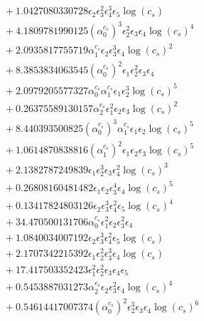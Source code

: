 \documentclass[10pt]{article}
\begin{document}
\begin{align*}
&{}  + 1.0427080330728 \epsilon_{2} \epsilon_{3}^{2} \epsilon_{4}^{3} \epsilon_{5} \log{\left(c_{s} \right)} \\
&{}  + 4.1809781990125 \left(\alpha_{0}^{c_s}\right)^{3} \epsilon_{2}^{2} \epsilon_{3} \epsilon_{4} \log{\left(c_{s} \right)}^{4} \\
&{}  + 2.0935817755719 \alpha_{1}^{c_s} \epsilon_{2} \epsilon_{3}^{3} \epsilon_{4} \log{\left(c_{s} \right)}^{2} \\
&{}  + 8.3853834063545 \left(\alpha_{0}^{c_s}\right)^{2} \epsilon_{1} \epsilon_{2}^{2} \epsilon_{3} \epsilon_{4} \\
&{}  + 2.0979205577327 \alpha_{0}^{c_s} \alpha_{1}^{c_s} \epsilon_{1} \epsilon_{2}^{3} \log{\left(c_{s} \right)}^{5} \\
&{}  + 0.26375589130157 \alpha_{2}^{c_s} \epsilon_{1}^{2} \epsilon_{2} \epsilon_{3} \log{\left(c_{s} \right)}^{2} \\
&{}  + 8.440393500825 \left(\alpha_{0}^{c_s}\right)^{3} \alpha_{1}^{c_s} \epsilon_{1} \epsilon_{2} \log{\left(c_{s} \right)}^{5} \\
&{}  + 1.0614870838816 \left(\alpha_{1}^{c_s}\right)^{2} \epsilon_{1} \epsilon_{2} \epsilon_{3} \log{\left(c_{s} \right)}^{5} \\
&{}  + 2.1382787249839 \epsilon_{1} \epsilon_{2}^{3} \epsilon_{3} \epsilon_{4}^{2} \log{\left(c_{s} \right)}^{3} \\
&{}  + 0.26808160481482 \epsilon_{1} \epsilon_{2} \epsilon_{3}^{4} \epsilon_{4} \log{\left(c_{s} \right)}^{5} \\
&{}  + 0.13417824803126 \epsilon_{2} \epsilon_{3}^{3} \epsilon_{4}^{2} \epsilon_{5} \log{\left(c_{s} \right)}^{4} \\
&{}  + 34.470500131706 \alpha_{0}^{c_s} \epsilon_{1}^{2} \epsilon_{2} \epsilon_{3}^{2} \epsilon_{4} \\
&{}  + 1.0840034007192 \epsilon_{2} \epsilon_{3}^{3} \epsilon_{4}^{2} \epsilon_{5} \log{\left(c_{s} \right)} \\
&{}  + 2.1707342215392 \epsilon_{1} \epsilon_{2}^{2} \epsilon_{3}^{3} \epsilon_{4} \log{\left(c_{s} \right)} \\
&{}  + 17.417503352423 \epsilon_{1}^{2} \epsilon_{2}^{2} \epsilon_{3} \epsilon_{4} \epsilon_{5} \\
&{}  + 0.5453887031273 \alpha_{2}^{c_s} \epsilon_{2} \epsilon_{3}^{2} \epsilon_{4} \log{\left(c_{s} \right)}^{4} \\
&{}  + 0.54614417007374 \left(\alpha_{0}^{c_s}\right)^{2} \epsilon_{2}^{3} \epsilon_{3} \epsilon_{4} \log{\left(c_{s} \right)}^{6} \\

\end{align*}
\end{document}
